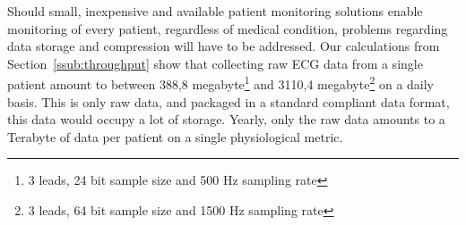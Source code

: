 Should small, inexpensive and available patient monitoring solutions enable monitoring of every patient, regardless of medical condition, problems regarding data storage and compression will have to be addressed. Our calculations from Section~\ref{ssub:throughput} show that collecting raw ECG data from a single patient amount to between 388,8 megabyte\footnote{3 leads, 24 bit sample size and 500 Hz sampling rate} and 3110,4 megabyte\footnote{3 leads, 64 bit sample size and 1500 Hz sampling rate} on a daily basis. This is only raw data, and packaged in a standard compliant data format, this data would occupy a lot of storage. Yearly, only the raw data amounts to a Terabyte of data per patient on a single physiological metric.


